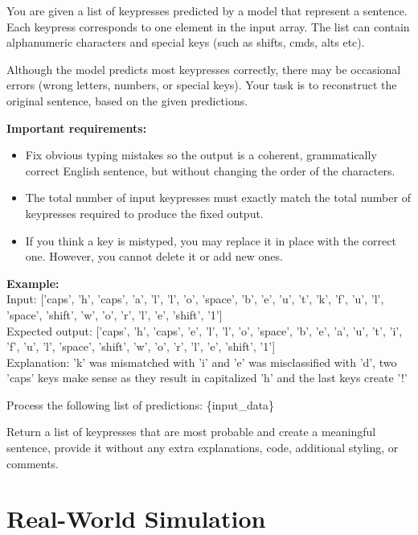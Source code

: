 \documentclass[a4paper,11pt,twoside]{report}
\theoremstyle{definition}
\begin{document}
\begin{tcolorbox}[colback=white!5,colframe=gray!20,title=Prompt to reconstruct the senteces using all keys,coltitle=black]
You are given a list of keypresses predicted by a model that represent a sentence.
Each keypress corresponds to one element in the input array. The list can contain alphanumeric characters and special keys (such as shifts, cmds, alts etc).

Although the model predicts most keypresses correctly, there may be occasional errors (wrong letters, numbers, or special keys).
Your task is to reconstruct the original sentence, based on the given predictions.

\textbf{Important requirements:}
\begin{itemize}
  \item Fix obvious typing mistakes so the output is a coherent, grammatically correct English sentence, but without changing the order of the characters.
  \item The total number of input keypresses must exactly match the total number of keypresses required to produce the fixed output.
  \item If you think a key is mistyped, you may replace it in place with the correct one. However, you cannot delete it or add new ones.
\end{itemize}

\textbf{Example:} \\
Input: ['caps', 'h', 'caps', 'a', 'l', 'l', 'o', 'space', 'b', 'e', 'u', 't', 'k', 'f', 'u', 'l', 'space', 'shift', 'w', 'o', 'r', 'l', 'e', 'shift', '1']\\
Expected output: ['caps', 'h', 'caps', 'e', 'l', 'l', 'o', 'space', 'b', 'e', 'a', 'u', 't', 'i', 'f', 'u', 'l', 'space', 'shift', 'w', 'o', 'r', 'l', 'e', 'shift', '1']\\
Explanation: 'k' was mismatched with 'i' and 'e' was misclassified with 'd', two 'caps' keys make sense as they result in capitalized 'h' and the last keys create '!'

Process the following list of predictions: \{input\_data\}

Return a list of keypresses that are most probable and create a meaningful sentence, provide it without any extra explanations, code, additional styling, or comments.
\end{tcolorbox}


\newpage
\section*{Real-World Simulation}
\label{appendix_real_world}
\end{document}
